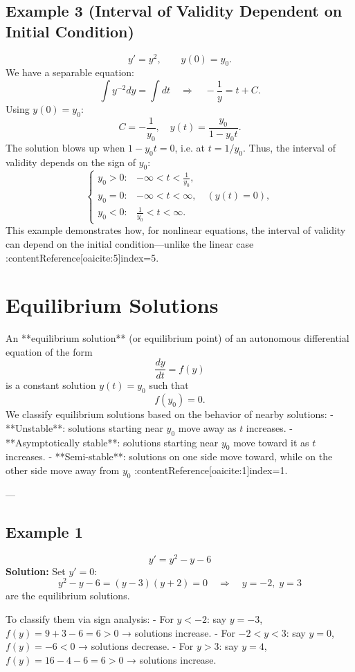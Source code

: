 \documentclass[12pt]{book}
\begin{document}
\subsection*{Example 3 (Interval of Validity Dependent on Initial Condition)}
\[
y' = y^2, \qquad y(0) = y_0.
\]
We have a separable equation:
\[
\int y^{-2} dy = \int dt \quad\Longrightarrow\quad -\frac{1}{y} = t + C.
\]
Using \(y(0) = y_0\):
\[
C = -\frac{1}{y_0}, \quad y(t) = \frac{y_0}{1 - y_0 t}.
\]
The solution blows up when \(1 - y_0 t = 0\), i.e. at \(t = 1 / y_0\). Thus, the interval of validity depends on the sign of \(y_0\):
\[
\begin{cases}
y_0 > 0: & -\infty < t < \frac{1}{y_0},\\
y_0 = 0: & -\infty < t < \infty, \quad (y(t) = 0),\\
y_0 < 0: & \frac{1}{y_0} < t < \infty.
\end{cases}
\]
This example demonstrates how, for nonlinear equations, the interval of validity can depend on the initial condition—unlike the linear case :contentReference[oaicite:5]{index=5}.

\section{Equilibrium Solutions}

An **equilibrium solution** (or equilibrium point) of an autonomous differential equation of the form
\[
\frac{dy}{dt} = f(y)
\]
is a constant solution \(y(t) = y_0\) such that
\[
f(y_0) = 0.
\]
We classify equilibrium solutions based on the behavior of nearby solutions:
- **Unstable**: solutions starting near \(y_0\) move away as \(t\) increases.
- **Asymptotically stable**: solutions starting near \(y_0\) move toward it as \(t\) increases.
- **Semi-stable**: solutions on one side move toward, while on the other side move away from \(y_0\) :contentReference[oaicite:1]{index=1}.

---

\subsection*{Example 1}
\[
y' = y^2 - y - 6
\]
\textbf{Solution:}
Set \(y' = 0\):
\[
y^2 - y - 6 = (y - 3)(y + 2) = 0
\quad\Longrightarrow\quad
y = -2,\; y = 3
\]
are the equilibrium solutions.

To classify them via sign analysis:
- For \(y < -2\): say \(y = -3\), \(f(y) = 9 + 3 - 6 = 6 > 0\) → solutions increase.
- For \(-2 < y < 3\): say \(y = 0\), \(f(y) = -6 < 0\) → solutions decrease.
- For \(y > 3\): say \(y = 4\), \(f(y) = 16 - 4 - 6 = 6 > 0\) → solutions increase.
\end{document}
